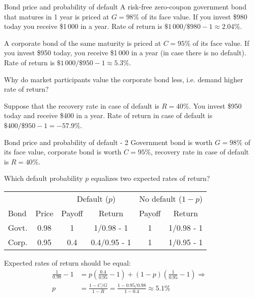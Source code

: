 \documentclass{beamer}
\begin{document}
\begin{frame}{Bond price and probability of default}
\justify
A risk-free zero-coupon government bond that matures in 1 year is priced at $G=98\%$ of its face value. If you invest \$980 today you receive \$1\,000 in a year. Rate of return is $\$1\,000 / \$980 - 1 \approx 2.04\%$.

\justify
A corporate bond of the same maturity is priced at $C=95\%$ of its face value. If you invest \$950 today, you receive \$1\,000 in a year (in case there is no default). Rate of return is $\$1\,000 / \$950 - 1 \approx 5.3\%$.

\justify
Why do market participants value the corporate bond less, i.e. demand higher rate of return?

\justify
Suppose that the recovery rate in case of default is $R=40\%$. You invest \$950 today and receive \$400 in a year. Rate of return in case of default is $\$400 / \$950 - 1 = -57.9\%$.
\end{frame}



\begin{frame}{Bond price and probability of default - 2}
\justify
Government bond is worth $G=98\%$ of its face value, corporate bond is worth $C=95\%$, recovery rate in case of default is $R=40\%$.

\justify
Which default probability $p$ equalizes two expected rates of return?

\justify
\centering
\begin{tabular}{l|c|c|c|c|c}
& & \multicolumn{2}{c|}{Default ($p$)} & \multicolumn{2}{c}{No default ($1-p$)} \\
Bond & Price & Payoff & Return & Payoff & Return \\
\hline
Govt.  & 0.98 & 1     & 1/0.98 - 1 & 1 & 1/0.98 - 1\\
Corp. & 0.95 & 0.4 & 0.4/0.95 - 1 & 1 & 1/0.95 - 1
\end{tabular}

\justify
Expected rates of return should be equal:
\begin{align*}
\frac{1}{0.98} - 1 &= p\left(\frac{0.4}{0.95} - 1\right) + (1-p)\left(\frac{1}{0.95} - 1\right) \Rightarrow \\
p &= \frac{1 - C/G}{1-R} = \frac{1 - 0.95/0.98}{1-0.4} \approx 5.1\%
\end{align*}
\end{frame}
\end{document}
